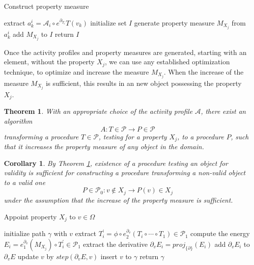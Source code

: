 \documentclass[preprint,12pt]{elsarticle}
\newcommand{\dP}{\mathcal{P}}
\newcommand{\D}{\partial}
\newtheorem{izrek}{Theorem}[section]
\newtheorem{corollary}{Corollary}[section]
\begin{document}
   \begin{algorithm}[H]
   \caption{Construct property measure}
   \label{alg:propertyMeasure}
   \begin{algorithmic}[1]
   \State extract $a^i_k=\mathcal{A}_i\circ e^{\D_{T_i}}T(v_k)$
	\EndFor
	\EndFor
	\State initialize set $I$
   \State generate property measure $M_{X_j}$ from $a^i_k$
   \State add $M_{X_j}$ to $I$
   \EndFor
   \State return $I$
   \EndProcedure
   \end{algorithmic}
   \end{algorithm}
   
   Once the activity profiles and property measures are generated, starting with an element, without the property $X_j$, we can use any established optimization technique, to optimize and increase the measure $M_{X_j}$. When the increase of the measure $M_{X_j}$ is sufficient, this results in an new object possessing the property $X_j$.
   
      \begin{izrek}\label{izr:algA}
           With an appropriate choice of the activity profile $\mathcal{A}$, there exist an algorithm
           \begin{equation}\label{eq:algA}
             A:T\in\dP\to P\in\dP
             \end{equation}
             transforming a procedure $T\in\dP$, testing for a property $X_j$, to a procedure $P$, such that it increases the property measure of any object in the domain. 
           \end{izrek}
           \begin{corollary}
              By Theorem \ref{izr:algA}, existence of a procedure testing an object for validity is sufficient for constructing a procedure transforming a non-valid object to a valid one
              $$P\in \dP_0:v\notin X_j\to P(v)\in X_j$$
              under the assumption that the increase of the property measure is sufficient.
              \end{corollary}
   
   \begin{algorithm}[H]
   \caption{Appoint property $X_j$ to $v\in \Omega$}
   \label{alg:appoint}
   \begin{algorithmic}[1]
   \State initialize path $\gamma$ with $v$
   \State extract $T^\prime_i=\phi\circ e^{\D_{v}}_2(T_i\circ\cdots\circ T_1)\in\dP_1$
   \State compute the energy $E_i=e^{\D_v}_1(M_{X_j})\circ T^\prime_i\in\dP_1$
   \State extract the derivative $\D_v E_i=proj_{\{\D\}}(E_i)$
   \State add $\D_v E_i$ to $\D_v E$
   \EndFor
   \State update $v$ by $step(\D_v E,v)$
   \State insert $v$ to $\gamma$
   \EndFor
   \State return $\gamma$
   \EndProcedure
   \end{algorithmic}
   \end{algorithm}
   
\end{document}
